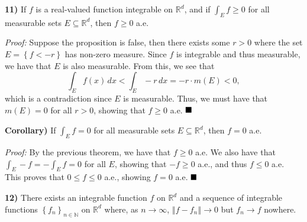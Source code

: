 \documentclass[12pt]{article}
\newcommand{\N}{\ensuremath{\mathbb{N}}}
\newcommand{\R}{\ensuremath{\mathbb{R}}}
\newcommand{\braceb}[1]{\left\{#1\right\}}
\newcommand{\dvertb}[1]{\left\Vert#1\right\Vert}
\newcommand{\proof}{\textit{Proof: }}
\newcommand{\done}{\ensuremath{\strut\hfill\blacksquare}}
\newcommand{\sectionskip}{\vspace{0.15in}}
\begin{document}
\sectionskip

\textbf{11)}
If \( f \) is a real-valued function integrable on \( \R^d \), and if
\( \int_E f \geq 0 \) for all measurable sets \( E \subseteq \R^d \), then
\( f \geq 0 \) a.e.

\proof
Suppose the proposition is false, then there exists some \( r > 0 \) where the
set \( E = \braceb{f < -r} \) has non-zero measure.
Since \( f \) is integrable and thus measurable, we have that \( E \) is also
measurable.
From this, we see that
\[
	\int_E f(x) \, dx
	< \int_E -r \, dx
	= -r \cdot m(E)
	< 0,
\]
which is a contradiction since \( E \) is measurable.
Thus, we must have that \( m(E) = 0 \) for all \( r > 0 \), showing that
\( f \geq 0 \) a.e.
\done

\textbf{Corollary)} If \( \int_E f = 0 \) for all measurable sets
\( E \subseteq \R^d \), then \( f = 0 \) a.e.

\proof
By the previous theorem, we have that \( f \geq 0 \) a.e.
We also have that \( \int_E -f = -\int_E f = 0 \) for all \( E \), showing
that \( -f \geq 0 \) a.e., and thus \( f \leq 0 \) a.e.
This proves that \( 0 \leq f \leq 0 \) a.e., showing \( f = 0 \) a.e.
\done

\sectionskip

\textbf{12)}
There exists an integrable function \( f \) on \( \R^d \) and a sequence of
integrable functions \( \braceb{f_n}_{n \in \N} \) on \( \R^d \) where, as
\( n \to \infty \), \( \dvertb{f - f_n} \to 0 \) but \( f_n \to f \) nowhere.
\end{document}
